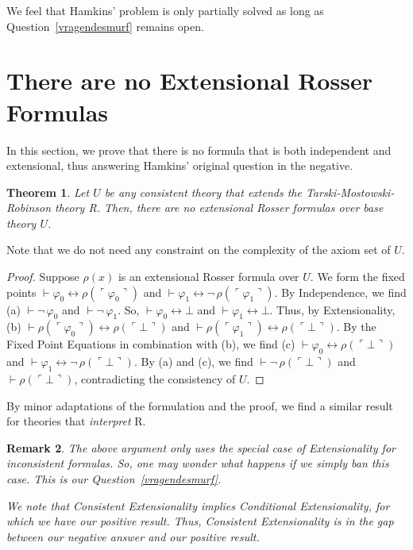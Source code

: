 \documentclass{amsart}
\newcommand{\qee} {\hspace*{2mm}\hfill \ding{109}}
\renewcommand{\iff}{\leftrightarrow}
\renewcommand{\phi}{\varphi}
\newtheorem{theorem}{Theorem}[section]
\newtheorem{rem}[theorem]{Remark}
\newenvironment{remark}{\begin{rem} \rm}{\qee\end{rem}}
\newcommand{\gnum}[1]{{\ulcorner #1 \urcorner}}
\begin{document}
 \noindent We feel that Hamkins' problem is only partially solved as long as Question~\ref{vragendesmurf}
 remains open.
  
  \section{There are no Extensional Rosser Formulas}
  
  In this section, we prove that there is no formula that is both independent and
  extensional, thus answering
   Hamkins' original question in the negative.
  
  \begin{theorem}\label{grotesmurf}
  Let $U$ be any consistent theory that extends the Tarski-Mostowski-Robinson theory {\sf R}.
  Then, there are no extensional Rosser formulas over base theory $U$.
  \end{theorem}
  
  \noindent
  Note that we do not need any constraint on the complexity of the axiom set of $U$.
  
  \begin{proof}
  Suppose $\rho(x)$ is an extensional Rosser formula over $U$. We form the fixed points
  $\vdash \phi_0 \iff \rho(\gnum {\phi_0})$ and $\vdash \phi_1 \iff \neg\, \rho(\gnum {\phi_1})$.
  By Independence, we find (a) $\vdash \neg\,\phi_0$ and $\vdash \neg\,\phi_1$. 
  So,  $\vdash \phi_0 \iff \bot$ and $\vdash \phi_1 \iff \bot$. Thus, by Extensionality, (b)
  $\vdash \rho(\gnum{\phi_0}) \iff \rho(\gnum \bot)$ and  $\vdash \rho(\gnum{\phi_1}) \iff \rho(\gnum \bot)$.
  By the Fixed Point Equations in combination with (b), we find (c) $\vdash \phi_0 \iff \rho(\gnum \bot)$ and 
  $\vdash \phi_1 \iff \neg\, \rho(\gnum \bot)$. By (a) and (c), we find
  $\vdash \neg\,\rho(\gnum\bot)$ and $\vdash \rho(\gnum\bot)$, contradicting the consistency of $U$.
  \end{proof}
  
  \noindent By minor adaptations of the formulation and the proof, we find a similar result for theories that \emph{interpret}
  {\sf R}. 
  
  
  \begin{remark}\label{remarkablesmurf}
  The above argument only uses the special case of Extensionality for inconsistent formulas.
  So, one may wonder what happens if we simply ban this case. 
  This is our Question~\ref{vragendesmurf}.
  
  We note that Consistent Extensionality implies Conditional Extensionality, for which we have our positive
  result. Thus, Consistent Extensionality is in the gap between our negative answer and our positive result.
  \end{remark}
  
\end{document}
